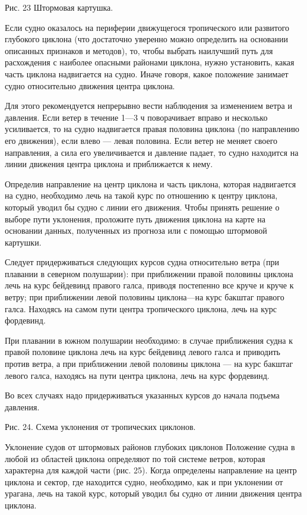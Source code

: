 Рис. 23 Штормовая картушка.

Если судно оказалось на периферии движущегося тропического или развитого глубокого циклона (что достаточно уверенно можно определить на основании описанных признаков и методов), то, чтобы выбрать наилучший путь для расхождения с наиболее опасными районами циклона, нужно установить, какая часть циклона надвигается на судно. Иначе говоря, какое положение занимает судно относительно движения центра циклона.

Для этого рекомендуется непрерывно вести наблюдения за изменением ветра и давления. Если ветер в течение 1—3 ч поворачивает вправо и несколько усиливается, то на судно надвигается правая половина циклона (по направлению его движения), если влево — левая половина. Если ветер не меняет своего направления, а сила его увеличивается и давление падает, то судно находится на линии движения центра циклона и приближается к нему.

Определив направление на центр циклона и часть циклона, которая надвигается на судно, необходимо лечь на такой курс по отношению к центру циклона, который уводил бы судно с линии его движения. Чтобы принять решение о выборе пути уклонения, проложите путь движения циклона на карте на основании данных, полученных из прогноза или с помощью штормовой картушки.

Следует придерживаться следующих курсов судна относительно ветра (при плавании в северном полушарии): при приближении правой половины циклона лечь на курс бейдевинд правого галса, приводя постепенно все круче и круче к ветру; при приближении левой половины циклона—на курс бакштаг правого галса. Находясь на самом пути центра тропического циклона, лечь на курс фордевинд.

При плавании в южном полушарии необходимо: в случае приближения судна к правой половине циклона лечь на курс бейдевинд левого галса и приводить против ветра, а при приближении левой половины циклона — на курс бакштаг левого галса, находясь на пути центра циклона, лечь на курс фордевинд.

Во всех случаях надо придерживаться указанных курсов до начала подъема давления.


Рис. 24. Схема уклонения от тропических циклонов.

Уклонение судов от штормовых районов глубоких циклонов
Положение судна в любой из областей циклона определяют по той системе ветров, которая характерна для каждой части (рис. 25). Когда определены направление на центр циклона и сектор, где находится судно, необходимо, как и при уклонении от урагана, лечь на такой курс, который уводил бы судно от линии движения центра циклона.


